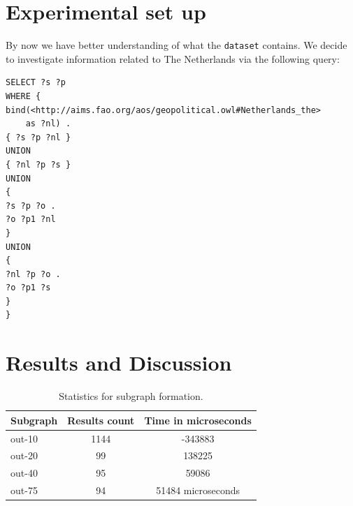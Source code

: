 \documentclass[runningheads,a4paper]{../../StyleFiles/llncs}
\begin{document}
\section{Experimental set up}
By now we have better understanding of what the \texttt{dataset} contains. We decide to investigate information related to The Netherlands via the following query:

\begin{lstlisting}[captionpos=b, caption=SPARQL query for calculating out degree of entities, label=lst:sparql, basicstyle=\ttfamily\small,frame=bt]
SELECT ?s ?p
WHERE {
bind(<http://aims.fao.org/aos/geopolitical.owl#Netherlands_the> 
	as ?nl) .
{ ?s ?p ?nl }
UNION
{ ?nl ?p ?s }
UNION
{
?s ?p ?o .
?o ?p1 ?nl
}
UNION
{
?nl ?p ?o .
?o ?p1 ?s
}
}
\end{lstlisting}

\section{Results and Discussion}
\begin{table}[h]
	\begin{center}
		\begin{tabular}{| l | c | c |}
			\hline
			\textbf{Subgraph} & \textbf{Results count} & \textbf{Time in microseconds} \\ \hline
			out-10 & 1144 & -343883 \\ \hline
			out-20 & 99 & 138225 \\ \hline
			out-40 & 95 & 59086 \\ \hline
			out-75 & 94 & 51484 microseconds \\ \hline
		\end{tabular}
		\caption{Statistics for subgraph formation.}
		\label{subgraph_table}
	\end{center}
\end{table}
\end{document}
